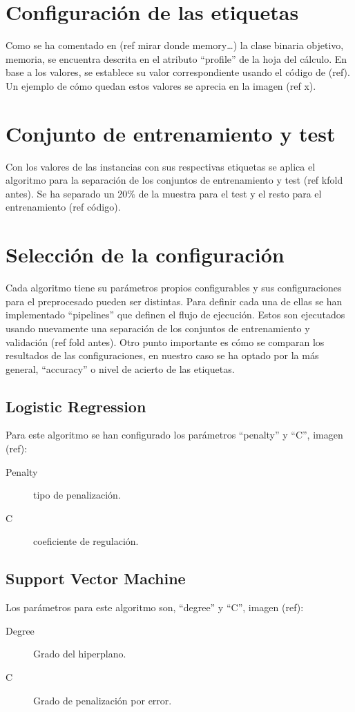 \section{Configuración de las etiquetas}
Como se ha comentado en (ref mirar donde memory…) la clase binaria objetivo, memoria, se encuentra descrita en el atributo ``profile'' de la hoja del cálculo. En base a los valores, se establece su valor correspondiente usando el código de (ref). Un ejemplo de cómo quedan estos valores se aprecia en la imagen (ref x).

\section{Conjunto de entrenamiento y test}
Con los valores de las instancias con sus respectivas etiquetas se aplica el algoritmo para la separación de los conjuntos de entrenamiento y test (ref kfold antes). Se ha separado un 20\% de la muestra para el test y el resto para el entrenamiento (ref código).

\section{Selección de la configuración}
Cada algoritmo tiene su parámetros propios configurables y sus configuraciones para el preprocesado pueden ser distintas. Para definir cada una de ellas se han implementado ``pipelines'' que definen el flujo de ejecución. Estos son ejecutados usando nuevamente una separación de los conjuntos de entrenamiento y validación (ref fold antes). Otro punto importante es cómo se comparan los resultados de las configuraciones, en nuestro caso se ha optado por la más general, ``accuracy'' o nivel de acierto de las etiquetas.

\subsection{Logistic Regression}
Para este algoritmo se han configurado los parámetros ``penalty'' y ``C'', imagen (ref):
\begin{description}
    \item [Penalty]  tipo de penalización.
    \item [C] coeficiente de regulación.
\end{description}

\subsection{Support Vector Machine}
Los parámetros para este algoritmo son, ``degree'' y ``C'', imagen (ref):
\begin{description}
    \item [Degree] Grado del hiperplano.
    \item [C] Grado de penalización por error.
\end{description}

